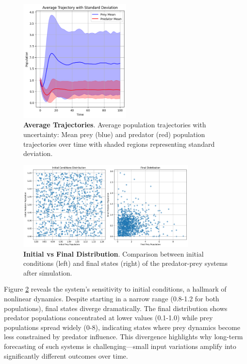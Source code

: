 \documentclass{article}
\begin{document}
\begin{figure} [H]
    \centering
    \includegraphics[width=0.5\textwidth]{overview_distribution}
    \caption{\textbf{Average Trajectories}. Average population trajectories with uncertainty: Mean prey (blue) and predator (red) population trajectories over time with shaded regions representing standard deviation.}
    \label{fig:average_trajectories}
\end{figure}

\begin{figure} [H]
    \centering
    \includegraphics[width=0.8\textwidth]{initial_final_distribution}
    \caption{\textbf{Initial vs Final Distribution}. Comparison between initial conditions (left) and final states (right) of the predator-prey systems after simulation.}
    \label{fig:initial}
\end{figure}

Figure \ref{fig:initial} reveals the system's sensitivity to initial conditions, a hallmark of nonlinear dynamics. Despite starting in a narrow range (0.8-1.2 for both populations), final states diverge dramatically. The final distribution shows predator populations concentrated at lower values (0.1-1.0) while prey populations spread widely (0-8), indicating states where prey dynamics become less constrained by predator influence. This divergence highlights why long-term forecasting of such systems is challenging—small input variations amplify into significantly different outcomes over time.
\end{document}
